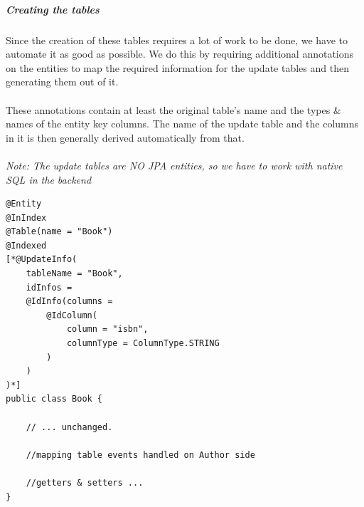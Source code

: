 \subparagraph{Creating the tables}

Since the creation of these tables requires a lot of work to be done, we have to automate it as good as possible. We do this by requiring additional annotations on the entities to map the required information for the update tables and then generating them out of it.
\\\\
These annotations contain at least the original table's name and the types \& names of the entity key columns. The name of the update table and the columns in it is then generally derived automatically from that.
\\\\
\textit{Note: The update tables are NO JPA entities, so we have to work with native SQL in the backend}
\\
\lstset{language=java}
\begin{lstlisting}[frame=htrbl, caption={Book.java with Hibernate Search annotations}, label={lst:book.java_3}]
@Entity
@InIndex
@Table(name = "Book")
@Indexed
[*@UpdateInfo(
	tableName = "Book", 
	idInfos = 
	@IdInfo(columns = 
		@IdColumn(
			column = "isbn", 
			columnType = ColumnType.STRING
		)
	)
)*]
public class Book {

	// ... unchanged. 
	
	//mapping table events handled on Author side
	
	//getters & setters ...
}
\end{lstlisting}


